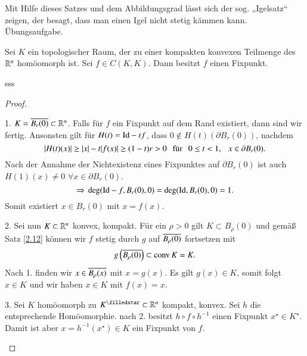 \begin{remark}
    Mit Hilfe dieses Satzes und dem Abbildungsgrad lässt sich der sog. „Igelsatz“ zeigen, der besagt,
    dass man einen Igel nicht stetig kämmen kann. Übungsaufgabe. 
\end{remark}

\begin{theorem}\label{2.13}
    Sei $K$ ein topologischer Raum, der zu einer kompakten konvexen Teilmenge des $\mathbb{R}^n$ homöomorph ist.
    Sei $f\in C(K,K)$. Dann besitzt $f$ einen Fixpunkt.
\end{theorem}
sss
\begin{proof}
    \begin{description}
    \item{1.}
    $K=\overline{B_r(0)}\subset\mathbb{R}^n$. Falls für $f$ ein Fixpunkt auf dem Rand existiert, dann sind wir fertig.
    Ansonsten gilt für $H(t)=\mathrm{Id}-tf$, dass $0\nin H(t)(\partial B_r(0))$, nachdem
    \[
        |H(t)(x)|\geq |x|-t|f(x)|\geq (1-t)r>0 \hspace{.25cm} \text{für} \hspace{.25cm} 0\leq t< 1, \hspace{.25cm} x\in\partial B_r(0).
    \]
    Nach der Annahme der Nichtexistenz eines Fixpunktes auf $\partial B_r(0)$ ist auch $H(1)(x)\neq 0$
    $\forall x \in \partial B_r(0)$.
    \[
        \Rightarrow \, \deg(\mathrm{Id}-f,B_r(0),0)=\deg(\mathrm{Id},B_r(0),0)=1.
    \]
    Somit existiert $x\in B_r(0)$ mit $x=f(x)$.
    \item{2.}
    Sei nun $K\subset \mathbb{R}^n$ konvex, kompakt. Für ein $\rho>0$ gilt $K\subset B_\rho(0)$ und gemäß Satz
    \ref{2.12} können wir $f$ stetig durch $g$ auf $\overline{B_{\rho}(0)}$ fortsetzen mit
    \[
        g\left( \overline{B_\rho (0)} \right)\subset \mathrm{conv} \, K=K.
    \]
    Nach 1. finden wir $x\in \overline{B_\rho(x)}$ mit $x=g(x)$.
    Es gilt $g(x)\in K$, somit folgt $x\in K$ und wir haben $x \in K$ mit $f(x)=x$.
    \item{3.}
    Sei $K$ homöomorph zu $K^\star \subset \R^n$ kompakt, konvex. Sei $h$ die entsprechende Homöomorphie.
    nach 2. besitzt $h\circ f \circ h^{-1}$ einen Fixpunkt $x^\star\in K^\star$. Damit ist aber $x=h^{-1}
    (x^\star)\in K$ ein Fixpunkt von $f$.
    \end{description}
    \[ \]
\end{proof}

